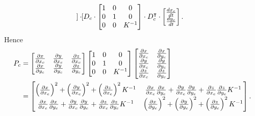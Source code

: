 \documentclass{ximera}
\begin{document}
\begin{problem}
\begin{freeResponse}
\begin{align*}
\begin{bmatrix}
    \end{bmatrix}\cdot D_{c}\cdot
    \begin{bmatrix}
      1 & 0 & 0\\
      0 & 1 & 0\\
    0 & 0 & K^{-1}
    \end{bmatrix}
    \cdot
    D_{c}^\transpose
    \cdot \begin{bmatrix}
      \frac{dx_c}{dt} \\ \frac{dy_c}{dt}
    \end{bmatrix}.
  \end{align*}
    Hence
    \begin{align*}
      P_c &=
      \begin{bmatrix}
        \pp[x]{x_c} & \pp[y]{x_c} & \pp[z]{x_c} \\
        \pp[x]{y_c} & \pp[y]{y_c} & \pp[z]{y_c}
      \end{bmatrix}
      \begin{bmatrix}
        1 & 0 & 0\\
        0 & 1 & 0\\
        0 & 0 & K^{-1}
      \end{bmatrix}
      \begin{bmatrix}
        \pp[x]{x_c} & \pp[x]{y_c}\\ 
        \pp[y]{x_c} & \pp[y]{y_c}\\
        \pp[z]{x_c} & \pp[z]{y_c}
      \end{bmatrix}\\
      &=
      \begin{bmatrix}
        \left(\pp[x]{x_c}\right)^2 + \left(\pp[y]{x_c}\right)^2 + \left(\pp[z]{x_c}\right)^2K^{-1} & \pp[x]{x_c}\pp[x]{y_c} + \pp[y]{x_c}\pp[y]{y_c} + \pp[z]{x_c}\pp[z]{y_c} K^{-1}\\
        \pp[x]{x_c}\pp[x]{y_c} + \pp[y]{x_c}\pp[y]{y_c} + \pp[z]{x_c}\pp[z]{y_c} K^{-1}       & \left(\pp[x]{y_c}\right)^2 + \left(\pp[y]{y_c}\right)^2 + \left(\pp[z]{y_c}\right)^2K^{-1}
      \end{bmatrix}.
    \end{align*}
  \end{freeResponse}
\end{problem}
\end{document}
